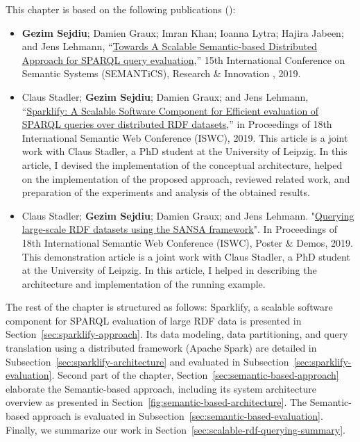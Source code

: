 This chapter is based on the following publications (\cite{sejdiu-2019-sansa-semantic-based-semantics,2019-sansa-sparklify-iswc, sansa-sparklify-ISWC-demo}):
\begin{itemize}
    \item \textbf{Gezim Sejdiu}; Damien Graux; Imran Khan; Ioanna Lytra; Hajira Jabeen; and Jens Lehmann, “\href{https://gezimsejdiu.github.io/publications/semantic_based_query_paper_SEMANTICS2019.pdf}{Towards A Scalable Semantic-based Distributed Approach for SPARQL query evaluation},” 15th International Conference on Semantic Systems (SEMANTiCS), Research \& Innovation , 2019.
     
    \item Claus Stadler; \textbf{Gezim Sejdiu}; Damien Graux; and Jens Lehmann, “\href{http://jens-lehmann.org/files/2019/iswc_sparklify.pdf}{Sparklify: A Scalable Software Component for Efficient evaluation of SPARQL queries over distributed RDF datasets},” in Proceedings of 18th International Semantic Web Conference (ISWC), 2019. 
    This article is a joint work with Claus Stadler, a PhD student at the University of Leipzig. 
    In this article, I devised the implementation of the conceptual architecture, helped on the implementation of the proposed approach, reviewed related work, and preparation of the experiments and analysis of the obtained results.
    
    \item Claus Stadler; \textbf{Gezim Sejdiu}; Damien Graux; and Jens Lehmann. "\href{https://gezimsejdiu.github.io/publications/sansa-sparklify-ISWC-demo.pdf}{Querying large-scale RDF datasets using the SANSA framework}".  In Proceedings of 18th International Semantic Web Conference (ISWC), Poster \& Demos, 2019.
    This demonstration article is a joint work with Claus Stadler, a PhD student at the University of Leipzig.
    In this article, I helped in describing the architecture and implementation of the running example.
\end{itemize}

The rest of the chapter is structured as follows:
Sparklify, a scalable software component for \gls{SPARQL} evaluation of large \gls{RDF} data is presented in Section~\ref{sec:sparklify-approach}.
Its data modeling, data partitioning, and query translation using a distributed framework (Apache Spark) are detailed in Subsection~\ref{sec:sparklify-architecture} and evaluated in Subsection~\ref{sec:sparklify-evaluation}.
Second part of the chapter, Section~\ref{sec:semantic-based-approach} elaborate the Semantic-based approach, including its system architecture overview as presented in Section~\ref{fig:semantic-based-architecture}.
The Semantic-based approach is evaluated in Subsection~\ref{sec:semantic-based-evaluation}.
Finally, we summarize our work in  Section~\ref{sec:scalable-rdf-querying-summary}.

